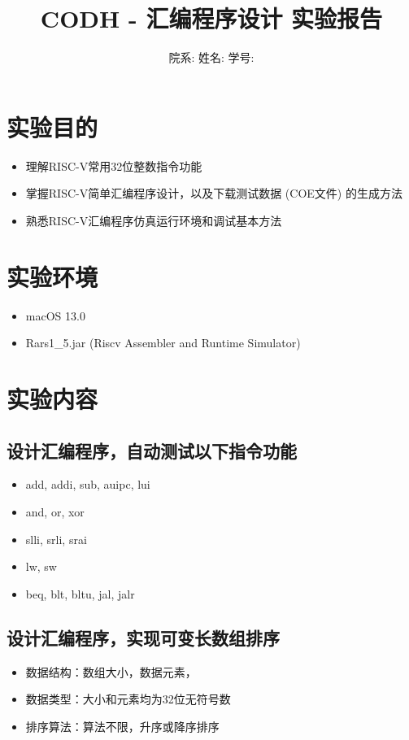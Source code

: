 \documentclass[a4paper]{article}
\title{\heiti 
CODH - 汇编程序设计 \hspace{0.3cm}实验报告}
\author{院系: \kaishu\underline{}\hspace{1.5cm}姓名: \kaishu \underline{}\hspace{1.5cm}学号: \kaishu \underline{}\hspace{1.5cm}}
\begin{document}
\maketitle

\section{实验目的}
\begin{itemize}
    \item 理解RISC-V常用32位整数指令功能
    \item 掌握RISC-V简单汇编程序设计，以及下载测试数据 (COE文件) 的生成方法
    \item 熟悉RISC-V汇编程序仿真运行环境和调试基本方法
    
    
    
\end{itemize}

\section{实验环境}
\begin{itemize}
  \item macOS 13.0
  \item Rars1\_5.jar (Riscv Assembler and Runtime Simulator)
\end{itemize}
\section{实验内容}
\subsection{设计汇编程序，自动测试以下指令功能}
\begin{itemize}
  \item add, addi, sub, auipc, lui
  \item and, or, xor
  \item slli, srli, srai
  \item lw, sw
  \item beq, blt, bltu, jal, jalr
  
  
\end{itemize}

\subsection{设计汇编程序，实现可变长数组排序}
\begin{itemize}
    \item 数据结构：数组大小，数据元素，
    \item 数据类型：大小和元素均为32位无符号数
    \item 排序算法：算法不限，升序或降序排序
    
  \end{itemize}
  
\end{document}
